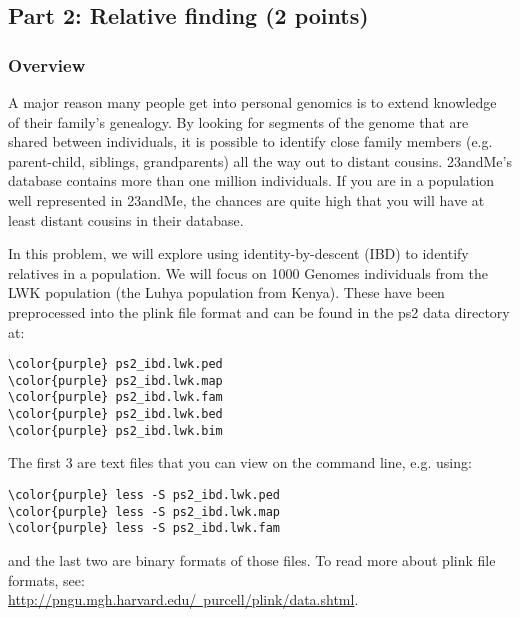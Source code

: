 \documentclass[12pt]{article}
\begin{document}

\subsection*{Part 2: Relative finding (2 points)}

\subsubsection*{Overview}

A major reason many people get into personal genomics is to extend knowledge of their family's genealogy. By looking for segments of the genome that are shared between individuals, it is possible to identify close family members (e.g. parent-child, siblings, grandparents) all the way out to distant cousins. 23andMe's database contains more than one million individuals. If you are in a population well represented in 23andMe, the chances are quite high that you will have at least distant cousins in their database.

In this problem, we will explore using identity-by-descent (IBD) to identify relatives in a population. We will focus on 1000 Genomes individuals from the LWK population (the Luhya population from Kenya). These have been preprocessed into the plink file format and can be found in the ps2 data directory at:

\begin{Verbatim}[commandchars=\\\{\}]
\color{purple} ps2_ibd.lwk.ped
\color{purple} ps2_ibd.lwk.map
\color{purple} ps2_ibd.lwk.fam
\color{purple} ps2_ibd.lwk.bed
\color{purple} ps2_ibd.lwk.bim
\end{Verbatim}

The first 3 are text files that you can view on the command line, e.g. using:
\begin{Verbatim}[commandchars=\\\{\}]
\color{purple} less -S ps2_ibd.lwk.ped
\color{purple} less -S ps2_ibd.lwk.map
\color{purple} less -S ps2_ibd.lwk.fam
\end{Verbatim}

and the last two are binary formats of those files. To read more about plink file formats, see:\\ \href{http://pngu.mgh.harvard.edu/~purcell/plink/data.shtml}{http://pngu.mgh.harvard.edu/~purcell/plink/data.shtml}.
\end{document}
